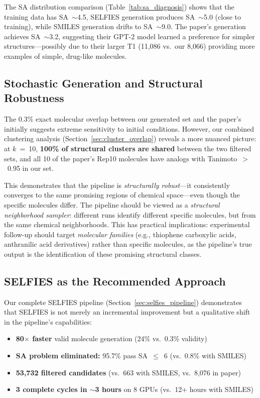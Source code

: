 \documentclass[11pt,a4paper]{article}
\begin{document}
The SA distribution comparison (Table~\ref{tab:sa_diagnosis}) shows that the training data has SA~$\sim$4.5, SELFIES generation produces SA~$\sim$5.0 (close to training), while SMILES generation drifts to SA~$\sim$9.0. The paper's generation achieves SA~$\sim$3.2, suggesting their GPT-2 model learned a preference for simpler structures---possibly due to their larger T1 (11,086 vs.\ our 8,066) providing more examples of simple, drug-like molecules.

\subsection{Stochastic Generation and Structural Robustness}

The 0.3\% exact molecular overlap between our generated set and the paper's initially suggests extreme sensitivity to initial conditions. However, our combined clustering analysis (Section~\ref{sec:cluster_overlap}) reveals a more nuanced picture: at $k$~=~10, \textbf{100\% of structural clusters are shared} between the two filtered sets, and all 10 of the paper's Rep10 molecules have analogs with Tanimoto~$>$~0.95 in our set.

This demonstrates that the pipeline is \textit{structurally robust}---it consistently converges to the same promising regions of chemical space---even though the specific molecules differ. The pipeline should be viewed as a \textit{structural neighborhood sampler}: different runs identify different specific molecules, but from the same chemical neighborhoods. This has practical implications: experimental follow-up should target \textit{molecular families} (e.g., thiophene carboxylic acids, anthranilic acid derivatives) rather than specific molecules, as the pipeline's true output is the identification of these promising structural classes.

\subsection{SELFIES as the Recommended Approach}

Our complete SELFIES pipeline (Section~\ref{sec:selfies_pipeline}) demonstrates that SELFIES is not merely an incremental improvement but a qualitative shift in the pipeline's capabilities:
\begin{itemize}[nosep]
    \item \textbf{80$\times$ faster} valid molecule generation (24\% vs.\ 0.3\% validity)
    \item \textbf{SA problem eliminated:} 95.7\% pass SA~$\leq$~6 (vs.\ 0.8\% with SMILES)
    \item \textbf{53,732 filtered candidates} (vs.\ 663 with SMILES, vs.\ 8,076 in paper)
    \item \textbf{3 complete cycles in $\sim$3 hours} on 8 GPUs (vs.\ 12+ hours with SMILES)
\end{itemize}
\end{document}
